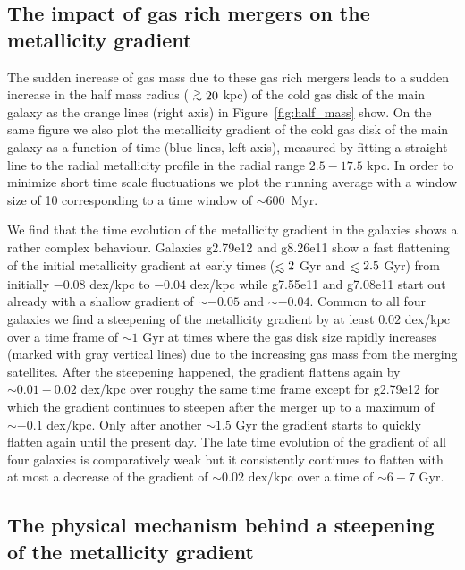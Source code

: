 \documentclass[useAMS,usenatbib]{mnras}
\newcommand{\gtsima}{$\; \buildrel > \over \sim \;$}
\newcommand{\gsim}{\lower.5ex\hbox{\gtsima}}
\def\lesssim{\mathrel{\hbox{\rlap{\hbox{\lower4pt\hbox{$\sim$}}}\hbox{$<$}}}}
\begin{document}
\subsection{The impact of gas rich mergers on the metallicity gradient} \label{sec:merger}

The sudden increase of gas mass due to these gas rich mergers leads to a sudden increase in the half mass radius ($\gsim20$ kpc) of the cold gas disk of the main galaxy as the orange lines (right axis) in Figure~\ref{fig:half_mass} show. On the same figure we also plot the metallicity gradient of the cold gas disk of the main galaxy as a function of time (blue lines, left axis), measured by fitting a straight line to the radial metallicity profile in the radial range $2.5 - 17.5$ kpc. In order to minimize short time scale fluctuations we plot the running average with a window size of 10 corresponding to a time window of $\sim600$~Myr. 

We find that the time evolution of the metallicity gradient in the galaxies shows a rather complex behaviour. Galaxies g2.79e12 and g8.26e11 show a fast flattening of the initial metallicity gradient at early times ($\lesssim2$ Gyr and $\lesssim 2.5$ Gyr) from initially $-0.08$ dex/kpc to $-0.04$ dex/kpc while g7.55e11 and g7.08e11 start out already with a shallow gradient of $\sim-0.05$ and $\sim-0.04$.
Common to all four galaxies we find a steepening of the metallicity gradient by at least $0.02$ dex/kpc over a time frame of $\sim1$ Gyr at times where the gas disk size rapidly increases (marked with gray vertical lines) due to the increasing gas mass from the merging satellites. After the steepening happened, the gradient flattens again by $\sim0.01-0.02$ dex/kpc over roughy the same time frame except for g2.79e12 for which the gradient continues to steepen after the merger up to a maximum of $\sim-0.1$ dex/kpc. Only after another $\sim1.5$ Gyr the gradient starts to quickly flatten again until the present day. The late time evolution of the gradient of all four galaxies is comparatively weak but it consistently continues to flatten with at most a decrease of the gradient of $\sim0.02$ dex/kpc over a time of $\sim6-7$ Gyr.

\subsection{The physical mechanism behind a steepening of the metallicity gradient}
\label{sec:steepening}
\end{document}
